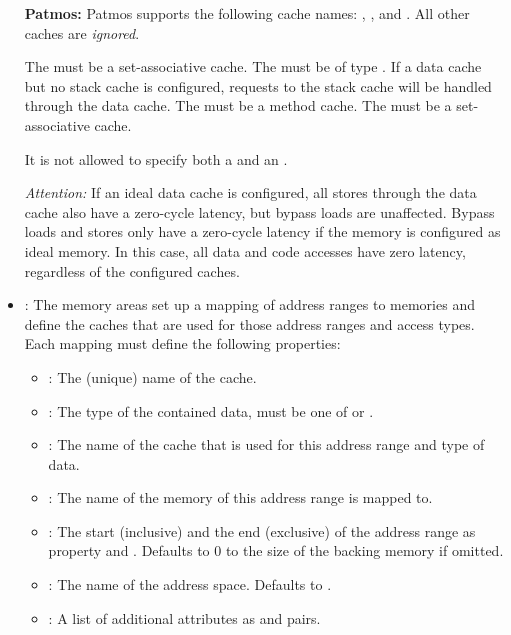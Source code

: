 \begin{itemize}
  \begin{framed}
  \textbf{Patmos:} Patmos supports the following cache names: , ,  and 
    . All other caches are \emph{ignored}.
    
    The  must be a set-associative cache.
    The  must be of type . If a data cache but no stack cache is configured,
    requests to the stack cache will be handled through the data cache.
    The  must be a method cache.
    The  must be a set-associative cache.

    It is not allowed to specify both a  and an .


    \emph{Attention:} If an ideal data cache is configured, all stores through the data cache also have a zero-cycle
    latency, but bypass loads are unaffected.
    Bypass loads and stores only have a zero-cycle latency if the  memory is configured as ideal memory. In
    this case, all data and code accesses have zero latency, regardless of the configured caches.
  \end{framed}

\item {}: The memory areas set up a mapping of address ranges to memories
  and define the caches that are used for those address ranges and access types. Each mapping must define the following
  properties:

  \begin{itemize}
  \item {}: The (unique) name of the cache.
  \item {}: The type of the contained data, must be one of  or .
  \item {}: The name of the cache that is used for this address range and type of data.
  \item {}: The name of the memory of this address range is mapped to.
  \item {}: The start (inclusive) and the end (exclusive) of the address range as property  and .
    Defaults to $0$ to the size of the backing memory if omitted.
  \item {}: The name of the address space. Defaults to .
  \item {}: A list of additional attributes as  and  pairs.
  \end{itemize}
  

\end{itemize}
